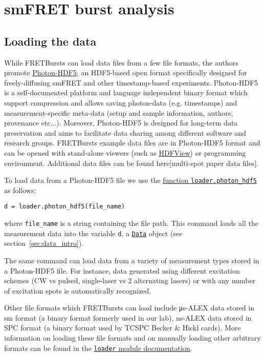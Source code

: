 \section{smFRET burst analysis}
\label{sec:analysis}

\subsection{Loading the data}
\label{sec:dataload}
While FRETBursts can load data files from a few file formats,
the authors promote \href{http://photon-hdf5.readthedocs.org/}{Photon-HDF5},
an HDF5-based open format specifically designed for freely-diffusing smFRET and other timestamp-based experiments.
Photon-HDF5 is a self-documented platform and language independent binary format
which support compression and allows saving photon-data (e.g. timestamps) and measurement-specific meta-data
(setup and sample information, authors, provenance etc...).
Moreover, Photon-HDF5 is designed for long-term data preservation and aims to facilitate data sharing
among different software and research groups.
FRETBursts example data files are in Photon-HDF5 format and can be opened with
stand-alone viewers (such as \href{http://www.hdfgroup.org/products/java/hdfview/}{HDFView}) or 
programming environment.
Additional data files can be found here[multi-spot paper data files].

To load data from a Photon-HDF5 file we use the
\href{http://fretbursts.readthedocs.org/en/latest/loader.html#fretbursts.loader.photon_hdf5}{function \texttt{loader.photon\_hdf5}} as follows:

\begin{lstlisting}
d = loader.photon_hdf5(file_name)
\end{lstlisting}

\noindent
where \verb|file_name| is a string containing the file path.
This command loads all the measurement data into the variable \verb|d|,
a \href{http://fretbursts.readthedocs.org/en/latest/data_class.html}{\texttt{Data}} object
(see section~\ref{sec:data_intro}).

The same command can load data from a variety of measurement types stored
in a Photon-HDF5 file. For instance, data generated using different excitation schemes
(CW vs pulsed, single-laser vs 2 alternating lasers) or with any number of excitation spots
is automatically recognized.

Other file formats which FRETBursts can load include μs-ALEX data stored in sm format
(a binary format formerly used in our lab),
ns-ALEX data stored in SPC format (a binary format used by TCSPC Becker \& Hickl cards).
More information on loading these file formats and on manually loading other arbitrary formats
can be found in the
\href{http://fretbursts.readthedocs.org/en/latest/loader.html}{\texttt{loader} module documentation}.

